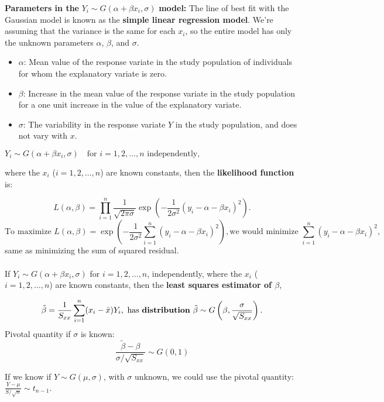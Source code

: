 \documentclass[a4paper,12pt]{article}
\begin{document}
\textbf{Parameters in the} \( Y_i \sim G(\alpha + \beta x_i, \sigma) \) \textbf{model:}
The line of best fit with the Gaussian model is known as the \textbf{simple linear regression model}. We're assuming that the variance is the same for each \( x_i \), so the entire model has only the unknown parameters \( \alpha \), \( \beta \), and \( \sigma \).


\begin{itemize}
    \item \(\alpha\): Mean value of the response variate in the study population of individuals for whom the explanatory variate is zero.
    \item \(\beta\): Increase in the mean value of the response variate in the study population for a one unit increase in the value of the explanatory variate.
    \item \(\sigma\): The variability in the response variate \(Y\) in the study population, and does not vary with \(x\).
\end{itemize}

\newpage
{}
$Y_i \sim G(\alpha + \beta x_i, \sigma) \quad \text{for } i = 1, 2, \dots, n \text{ independently},$

where the \(x_i \) (\(i = 1, 2, \dots, n\)) are known constants, then the \textbf{likelihood function} is:

\[
L(\alpha, \beta) = \prod_{i=1}^n \frac{1}{\sqrt{2\pi\sigma}} 
\exp\left( -\frac{1}{2\sigma^2} (y_i - \alpha - \beta x_i)^2 \right).
\]
\[ \text{To maximize }
L(\alpha, \beta) = \exp\left( -\frac{1}{2\sigma^2} \sum_{i=1}^n (y_i - \alpha - \beta x_i)^2 \right),
\text{we would minimize }
\sum_{i=1}^n (y_i - \alpha - \beta x_i)^2,
\]
same as minimizing the sum of squared residual.
\\
\\If \( Y_i \sim G(\alpha + \beta x_i, \sigma) \) for \( i = 1, 2, \dots, n \), independently, where the \( x_i \) (\( i = 1, 2, \dots, n \)) are known constants, then the \textbf{least squares estimator of \(\beta\)},

\[
\tilde{\beta} = \frac{1}{S_{xx}} \sum_{i=1}^n (x_i - \bar{x}) Y_i,
\text{ has \textbf{distribution} }
\tilde{\beta} \sim G\left(\beta, \frac{\sigma}{\sqrt{S_{xx}}}\right).
\]
Pivotal quantity if \(\sigma\) is known:
\[
\frac{\tilde{\beta} - \beta}{\sigma / \sqrt{S_{xx}}} \sim G(0, 1)
\]

If we know if \(Y \sim G(\mu, \sigma)\), with \(\sigma\) unknown, we could use the pivotal quantity:
$\frac{Y - \mu}{S / \sqrt{n}} \sim t_{n-1}.$
\end{document}

